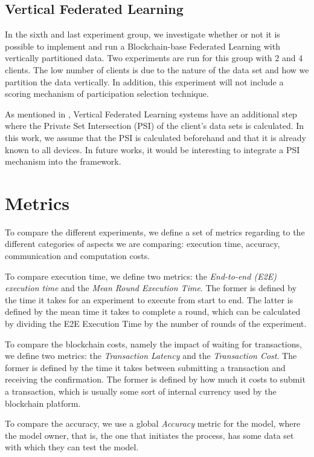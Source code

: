 \subsection{Vertical Federated Learning}

In the sixth and last experiment group, we investigate whether or not it is possible to implement and run a Blockchain-base Federated Learning with vertically partitioned data. Two experiments are run for this group with 2 and 4 clients. The low number of clients is due to the nature of the data set and how we partition the data vertically. In addition, this experiment will not include a scoring mechanism of participation selection technique.

As mentioned in , Vertical Federated Learning systems have an additional step where the Private Set Intersection (PSI) of the client's data sets is calculated. In this work, we assume that the PSI is calculated beforehand and that it is already known to all devices. In future works, it would be interesting to integrate a PSI mechanism into the framework.

\section{Metrics}

To compare the different experiments, we define a set of metrics regarding to the different categories of aspects we are comparing: execution time, accuracy, communication and computation costs.

To compare execution time, we define two metrics: the \textit{End-to-end (E2E) execution time} and the \textit{Mean Round Execution Time}. The former is defined by the time it takes for an experiment to execute from start to end. The latter is defined by the mean time it takes to complete a round, which can be calculated by dividing the E2E Execution Time by the number of rounds of the experiment.

To compare the blockchain costs, namely the impact of waiting for transactions, we define two metrics: the \textit{Transaction Latency} and the \textit{Transaction Cost}. The former is defined by the time it takes between submitting a transaction and receiving the confirmation. The former is defined by how much it costs to submit a transaction, which is usually some sort of internal currency used by the blockchain platform.

To compare the accuracy, we use a global \textit{Accuracy} metric for the model, where the model owner, that is, the one that initiates the process, has some data set with which they can test the model.

